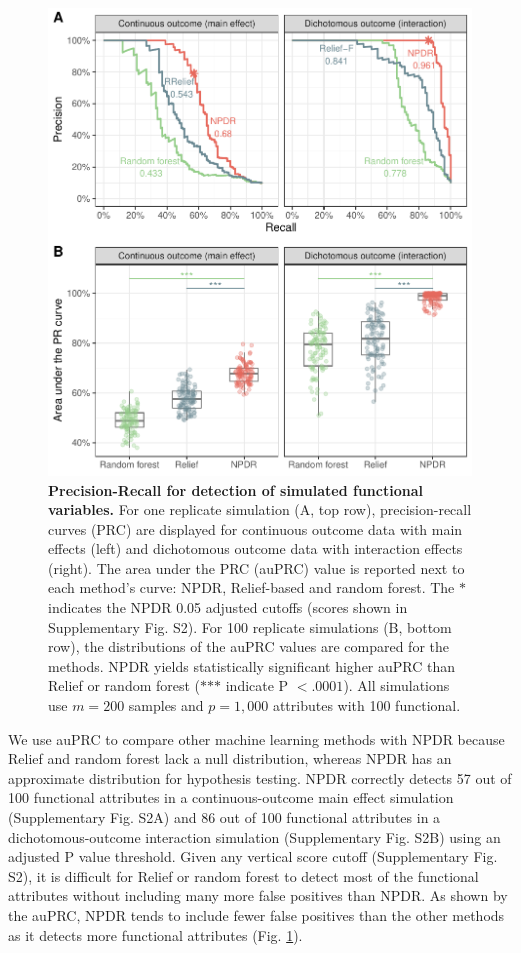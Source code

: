 \documentclass{bioinfo}
\begin{document}
\begin{figure}[!tbp]
\centerline{\includegraphics[trim = 0 0 0 0, scale = 0.55, clip]{../../figs/pr_compare_100.pdf}}
\caption{{\bf Precision-Recall for detection of simulated functional variables.} For one replicate simulation (A, top row), precision-recall curves (PRC) are displayed for continuous outcome data with main effects (left) and dichotomous outcome data with interaction effects (right). The area under the PRC (auPRC) value is reported next to each method's curve: NPDR, Relief-based and random forest. The $\ast$ indicates the NPDR 0.05 adjusted cutoffs (scores shown in Supplementary Fig. S2). For 100 replicate simulations (B, bottom row), the distributions of the auPRC values are compared for the methods. NPDR yields statistically significant higher auPRC than Relief or random forest ($\ast$$\ast$$\ast$ indicate P $<.0001$). All simulations use $m = 200$ samples and $p = 1,000$ attributes with 100 functional.}
\label{fig:pr_curve}
\end{figure}

We use auPRC to compare other machine learning methods with NPDR because Relief and random forest lack a null distribution, whereas NPDR has an approximate distribution for hypothesis testing.
NPDR correctly detects 57 out of 100 functional attributes in a continuous-outcome main effect simulation (Supplementary Fig. S2A) and 86 out of 100 functional attributes in a dichotomous-outcome interaction simulation (Supplementary Fig. S2B) using an adjusted P value threshold.
Given any vertical score cutoff (Supplementary Fig. S2), it is difficult for Relief or random forest to detect most of the functional attributes without including many more false positives than NPDR.
As shown by the auPRC, NPDR tends to include fewer false positives than the other methods as it detects more functional attributes (Fig. \ref{fig:pr_curve}).
\end{document}
